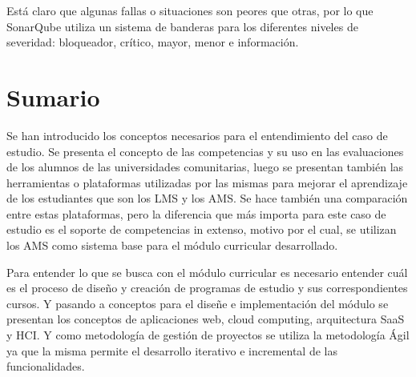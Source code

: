Está claro que algunas fallas o situaciones son peores que otras, por lo que SonarQube utiliza un sistema de banderas para los diferentes niveles de severidad: bloqueador, crítico, mayor, menor e información.

\section{Sumario}
Se han introducido los conceptos necesarios para el entendimiento del caso de estudio. Se presenta el concepto de las competencias y su uso en las evaluaciones de los alumnos de las universidades comunitarias, luego se presentan también las herramientas o plataformas utilizadas por las mismas para mejorar el aprendizaje de los estudiantes que son los LMS y los AMS. Se hace también una comparación entre estas plataformas, pero la diferencia que más importa para este caso de estudio es el soporte de competencias in extenso, motivo por el cual, se utilizan los AMS como sistema base para el módulo curricular desarrollado.

Para entender lo que se busca con el módulo curricular es necesario entender cuál es el proceso de diseño y creación de programas de estudio y sus correspondientes cursos. Y pasando a conceptos para el diseñe e implementación del módulo se presentan los conceptos de aplicaciones web, cloud computing, arquitectura SaaS y HCI. Y como metodología de gestión de proyectos se utiliza la metodología Ágil ya que la misma permite el desarrollo iterativo e incremental de las funcionalidades.